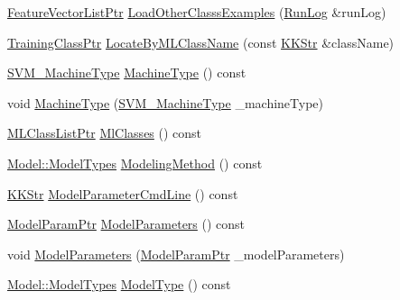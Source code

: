 \begin{DoxyCompactItemize}
\hyperlink{namespace_k_k_m_l_l_acf2ba92a3cf03e2b19674b24ff488ef6}{Feature\+Vector\+List\+Ptr} \hyperlink{class_k_k_m_l_l_1_1_training_configuration2_aa0e5b42cc4aa807ca8d3e2f4a279fa06}{Load\+Other\+Classs\+Examples} (\hyperlink{class_k_k_b_1_1_run_log}{Run\+Log} \&run\+Log)
\item 
\hyperlink{namespace_k_k_m_l_l_aee99044bdeeb0a43cdc845c2c01b1c14}{Training\+Class\+Ptr} \hyperlink{class_k_k_m_l_l_1_1_training_configuration2_a3b0e6e3628b7262485979a3e159701af}{Locate\+By\+M\+L\+Class\+Name} (const \hyperlink{class_k_k_b_1_1_k_k_str}{K\+K\+Str} \&class\+Name)
\item 
\hyperlink{namespace_k_k_m_l_l_ad917464bc631109a3021cf02cd27af9a}{S\+V\+M\+\_\+\+Machine\+Type} \hyperlink{class_k_k_m_l_l_1_1_training_configuration2_a8d1610c33f972925bdc6e9598b29623d}{Machine\+Type} () const 
\item 
void \hyperlink{class_k_k_m_l_l_1_1_training_configuration2_a7d9360aad9fcb8a2295938662e13a124}{Machine\+Type} (\hyperlink{namespace_k_k_m_l_l_ad917464bc631109a3021cf02cd27af9a}{S\+V\+M\+\_\+\+Machine\+Type} \+\_\+machine\+Type)
\item 
\hyperlink{namespace_k_k_m_l_l_af091cde3f4a4315658b41a5e7583fc26}{M\+L\+Class\+List\+Ptr} \hyperlink{class_k_k_m_l_l_1_1_training_configuration2_ab17bb8a308091778917ccf24dcbd6c5b}{Ml\+Classes} () const 
\item 
\hyperlink{class_k_k_m_l_l_1_1_model_aeda4060e088c67446ca993eefcecea06}{Model\+::\+Model\+Types} \hyperlink{class_k_k_m_l_l_1_1_training_configuration2_abbb0c866885ac40334099c04f0faab21}{Modeling\+Method} () const 
\item 
\hyperlink{class_k_k_b_1_1_k_k_str}{K\+K\+Str} \hyperlink{class_k_k_m_l_l_1_1_training_configuration2_a604f1166e794305db3ed40d272cbe559}{Model\+Parameter\+Cmd\+Line} () const 
\item 
\hyperlink{namespace_k_k_m_l_l_a76c2dec3304f1a2dc2e357872e4fb320}{Model\+Param\+Ptr} \hyperlink{class_k_k_m_l_l_1_1_training_configuration2_a5087f98915a824279a251734d5ed0982}{Model\+Parameters} () const 
\item 
void \hyperlink{class_k_k_m_l_l_1_1_training_configuration2_a5b0f2395fa963101931177ec13060248}{Model\+Parameters} (\hyperlink{namespace_k_k_m_l_l_a76c2dec3304f1a2dc2e357872e4fb320}{Model\+Param\+Ptr} \+\_\+model\+Parameters)
\item 
\hyperlink{class_k_k_m_l_l_1_1_model_aeda4060e088c67446ca993eefcecea06}{Model\+::\+Model\+Types} \hyperlink{class_k_k_m_l_l_1_1_training_configuration2_a81c47b1f388255d6b97134189fd6c232}{Model\+Type} () const 

\end{DoxyCompactItemize}

